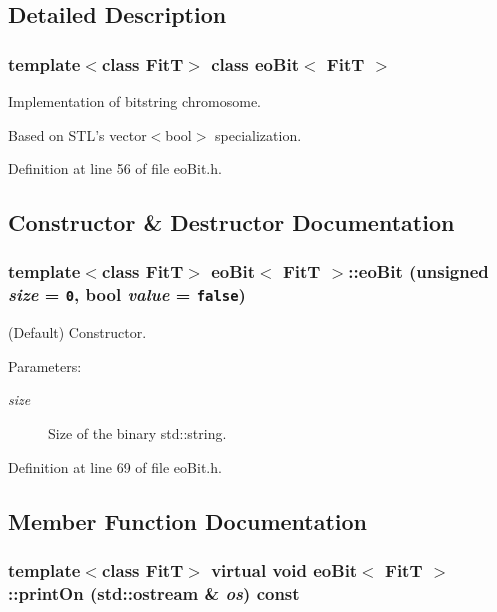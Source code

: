 \subsection{Detailed Description}
\subsubsection*{template$<$class Fit\-T$>$ class eo\-Bit$<$ Fit\-T $>$}

Implementation of bitstring chromosome. 

Based on STL's vector$<$bool$>$ specialization. 



Definition at line 56 of file eo\-Bit.h.

\subsection{Constructor \& Destructor Documentation}
\subsubsection{\setlength{\rightskip}{0pt plus 5cm}template$<$class Fit\-T$>$ {\bf eo\-Bit}$<$ {\bf Fit\-T} $>$::{\bf eo\-Bit} (unsigned {\em size} = {\tt 0}, bool {\em value} = {\tt false})\hspace{0.3cm}{\tt  [inline]}}\label{classeo_bit_a0}


(Default) Constructor. 

\begin{Desc}
\item[Parameters:]
\begin{description}
\item[{\em size}]Size of the binary std::string. \end{description}
\end{Desc}


Definition at line 69 of file eo\-Bit.h.

\subsection{Member Function Documentation}
\subsubsection{\setlength{\rightskip}{0pt plus 5cm}template$<$class Fit\-T$>$ virtual void {\bf eo\-Bit}$<$ {\bf Fit\-T} $>$::print\-On (std::ostream \& {\em os}) const\hspace{0.3cm}{\tt  [inline, virtual]}}\label{classeo_bit_a2}


